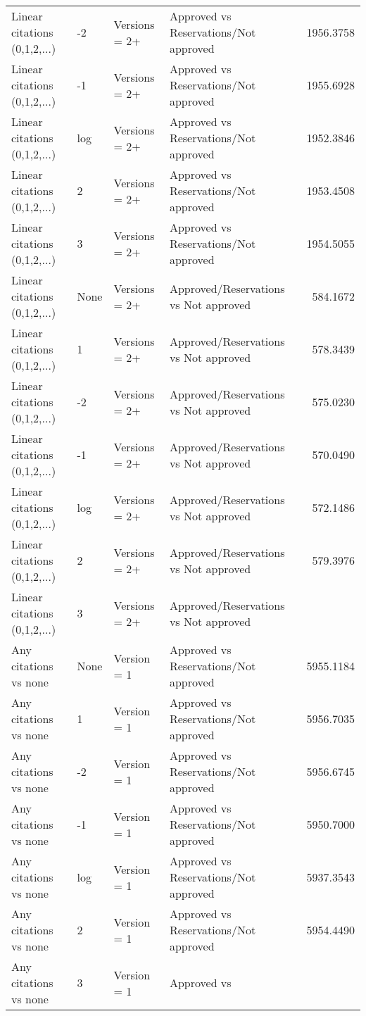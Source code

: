 \begin{table}[ht]
\begin{tabular}{llllr}
  Linear citations (0,1,2,...) & -2 & Versions = 2+ & Approved vs
Reservations/Not approved & 1956.3758 \\ 
  Linear citations (0,1,2,...) & -1 & Versions = 2+ & Approved vs
Reservations/Not approved & 1955.6928 \\ 
  Linear citations (0,1,2,...) & log & Versions = 2+ & Approved vs
Reservations/Not approved & 1952.3846 \\ 
  Linear citations (0,1,2,...) & 2 & Versions = 2+ & Approved vs
Reservations/Not approved & 1953.4508 \\ 
  Linear citations (0,1,2,...) & 3 & Versions = 2+ & Approved vs
Reservations/Not approved & 1954.5055 \\ 
  Linear citations (0,1,2,...) & None & Versions = 2+ & Approved/Reservations
vs Not approved & 584.1672 \\ 
  Linear citations (0,1,2,...) & 1 & Versions = 2+ & Approved/Reservations
vs Not approved & 578.3439 \\ 
  Linear citations (0,1,2,...) & -2 & Versions = 2+ & Approved/Reservations
vs Not approved & 575.0230 \\ 
  Linear citations (0,1,2,...) & -1 & Versions = 2+ & Approved/Reservations
vs Not approved & 570.0490 \\ 
  Linear citations (0,1,2,...) & log & Versions = 2+ & Approved/Reservations
vs Not approved & 572.1486 \\ 
  Linear citations (0,1,2,...) & 2 & Versions = 2+ & Approved/Reservations
vs Not approved & 579.3976 \\ 
  Linear citations (0,1,2,...) & 3 & Versions = 2+ & Approved/Reservations
vs Not approved &  \\ 
  Any citations vs none & None & Version = 1 & Approved vs
Reservations/Not approved & 5955.1184 \\ 
  Any citations vs none & 1 & Version = 1 & Approved vs
Reservations/Not approved & 5956.7035 \\ 
  Any citations vs none & -2 & Version = 1 & Approved vs
Reservations/Not approved & 5956.6745 \\ 
  Any citations vs none & -1 & Version = 1 & Approved vs
Reservations/Not approved & 5950.7000 \\ 
  Any citations vs none & log & Version = 1 & Approved vs
Reservations/Not approved & 5937.3543 \\ 
  Any citations vs none & 2 & Version = 1 & Approved vs
Reservations/Not approved & 5954.4490 \\ 
  Any citations vs none & 3 & Version = 1 & Approved vs

\end{tabular}
\end{table}
